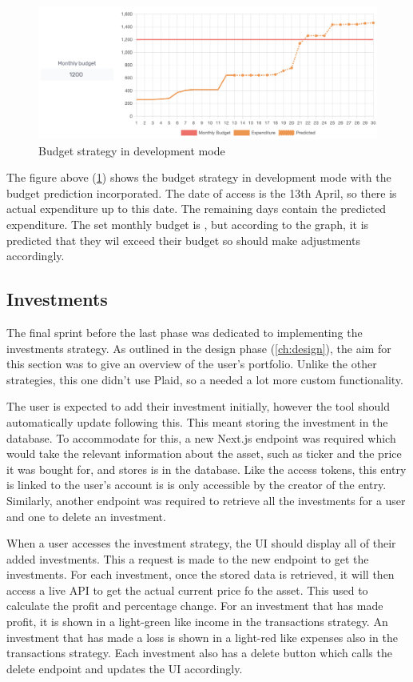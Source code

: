 \begin{figure}[H]
	\centering
	\includegraphics[width=\textwidth]{images/Budget_strategy.png}
	\caption{Budget strategy in development mode}
	\label{fig:BudgetStrategy}
\end{figure}

The figure above (\ref{fig:BudgetStrategy}) shows the budget strategy in development mode with the budget prediction incorporated. The date of access is the 13th April, so there is actual expenditure up to this date. The remaining days contain the predicted expenditure. The set monthly budget is , but according to the graph, it is predicted that they wil exceed their budget so should make adjustments accordingly.

\subsection{Investments}
The final sprint before the last phase was dedicated to implementing the investments strategy. As outlined in the design phase (\ref{ch:design}), the aim for this section was to give an overview of the user's portfolio. Unlike the other strategies, this one didn't use Plaid, so a needed a lot more custom functionality.

The user is expected to add their investment initially, however the tool should automatically update following this. This meant storing the investment in the database. To accommodate for this, a new Next.js endpoint was required which would take the relevant information about the asset, such as ticker and the price it was bought for, and stores is in the database. Like the access tokens, this entry is linked to the user's account is is only accessible by the creator of the entry. Similarly, another endpoint was required to retrieve all the investments for a user and one to delete an investment.

When a user accesses the investment strategy, the UI should display all of their added investments. This a request is made to the new endpoint to get the investments. For each investment, once the stored data is retrieved, it will then access a live API to get the actual current price fo the asset. This used to calculate the profit and percentage change. For an investment that has made profit, it is shown in a light-green like income in the transactions strategy. An investment that has made a loss is shown in a light-red like expenses also in the transactions strategy. Each investment also has a delete button which calls the delete endpoint and updates the UI accordingly.

